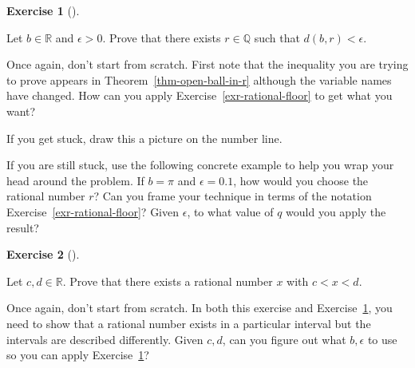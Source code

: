 \documentclass[
  letterpaper,
  DIV=11,
  numbers=noendperiod]{scrreprt}
\def\R{\mathbb R}
\def\Q{\mathbb Q}
\theoremstyle{plain}
\theoremstyle{definition}
\newtheorem{exercise}{Exercise}[chapter]
\theoremstyle{plain}
\theoremstyle{plain}
\theoremstyle{definition}
\theoremstyle{definition}
\theoremstyle{remark}
\begin{document}
\begin{exercise}[]\protect\hypertarget{exr-rational-in-neighborhood}{}\label{exr-rational-in-neighborhood}

Let \(b\in\R\) and \(\epsilon>0\). Prove that there exists \(r\in\Q\)
such that \(d(b,r)<\epsilon\).

\end{exercise}

\begin{tcolorbox}[enhanced jigsaw, titlerule=0mm, opacitybacktitle=0.6, leftrule=.75mm, bottomrule=.15mm, left=2mm, arc=.35mm, colback=white, rightrule=.15mm, colframe=quarto-callout-tip-color-frame, toptitle=1mm, breakable, opacityback=0, colbacktitle=quarto-callout-tip-color!10!white, bottomtitle=1mm, title=\textcolor{quarto-callout-tip-color}{\faLightbulb}\hspace{0.5em}{Hint}, coltitle=black, toprule=.15mm]

Once again, don't start from scratch. First note that the inequality you
are trying to prove appears in Theorem~\ref{thm-open-ball-in-r} although
the variable names have changed. How can you apply
Exercise~\ref{exr-rational-floor} to get what you want?

If you get stuck, draw this a picture on the number line.

If you are still stuck, use the following concrete example to help you
wrap your head around the problem. If \(b=\pi\) and \(\epsilon=0.1\),
how would you choose the rational number \(r\)? Can you frame your
technique in terms of the notation Exercise~\ref{exr-rational-floor}?
Given \(\epsilon\), to what value of \(q\) would you apply the result?

\end{tcolorbox}

\begin{exercise}[]\protect\hypertarget{exr-rational-between-any-two-reals}{}\label{exr-rational-between-any-two-reals}

Let \(c,d\in\R\). Prove that there exists a rational number \(x\) with
\(c<x<d\).

\end{exercise}

\begin{tcolorbox}[enhanced jigsaw, titlerule=0mm, opacitybacktitle=0.6, leftrule=.75mm, bottomrule=.15mm, left=2mm, arc=.35mm, colback=white, rightrule=.15mm, colframe=quarto-callout-tip-color-frame, toptitle=1mm, breakable, opacityback=0, colbacktitle=quarto-callout-tip-color!10!white, bottomtitle=1mm, title=\textcolor{quarto-callout-tip-color}{\faLightbulb}\hspace{0.5em}{Hint}, coltitle=black, toprule=.15mm]

Once again, don't start from scratch. In both this exercise and
Exercise~\ref{exr-rational-in-neighborhood}, you need to show that a
rational number exists in a particular interval but the intervals are
described differently. Given \(c,d\), can you figure out what
\(b,\epsilon\) to use so you can apply
Exercise~\ref{exr-rational-in-neighborhood}?

\end{tcolorbox}
\end{document}
